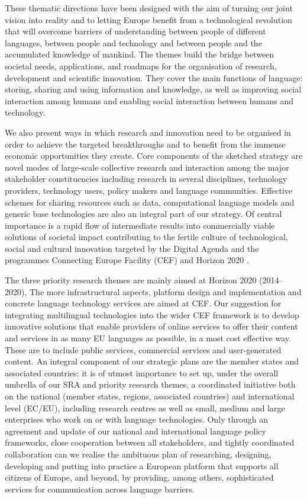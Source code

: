 \documentclass[10pt, plain]{../../metanetpaper}
\begin{document}
\begin{multicols}{2}
These thematic directions have been designed with the aim of turning our joint vision into reality and to letting Europe benefit from a technological revolution that will overcome barriers of understanding between people of different languages, between people and technology and between people and the accumulated knowledge of mankind. The themes build the bridge between societal needs, applications, and roadmaps for the organisation of research, development and scientific innovation. They cover the main functions of language: storing, sharing and using information and knowledge, as well as improving social interaction among humans and enabling social interaction between humans and technology.

We also present ways in which research and innovation need to be organised in order to achieve the targeted breakthroughs and to benefit from the immense economic opportunities they create. Core components of the sketched strategy are novel modes of large-scale collective research and interaction among the major stakeholder constituencies including research in several disciplines, technology providers, technology users, policy makers and language communities. Effective schemes for sharing resources such as data, computational language models and generic base technologies are also an integral part of our strategy. Of central importance is a rapid flow of intermediate results into commercially viable solutions of societal impact contributing to the fertile culture of technological, social and cultural innovation targeted by the Digital Agenda \cite{DA2010} and the programmes Connecting Europe Facility (CEF) \cite{CEF2011} and Horizon 2020 \cite{H2020}.

The three priority research themes are mainly aimed at Horizon 2020 (2014--2020). The more infrastructural aspects, platform design and implementation and concrete language technology services are aimed at CEF. Our suggestion for integrating multilingual technologies into the wider CEF framework is to develop innovative solutions that enable providers of online services to offer their content and services in as many EU languages as possible, in a most cost effective way. These are to include public services, commercial services and user-generated content. An integral component of our strategic plans are the member states and associated countries: it is of utmost importance to set up, under the overall umbrella of our SRA and priority research themes, a coordinated initiative both on the national (member states, regions, associated countries) and international level (EC/EU), including research centres as well as small, medium and large enterprises who work on or with language technologies. Only through an agreement and update of our national and international language policy frameworks, close cooperation between all stakeholders, and tightly coordinated collaboration can we realise the ambituous plan of researching, designing, developing and putting into practice a European platform \cite{bruegel12} that supports all citizens of Europe, and beyond, by providing, among others, sophisticated services for communication across language barriers.  
\end{multicols}
\end{document}
